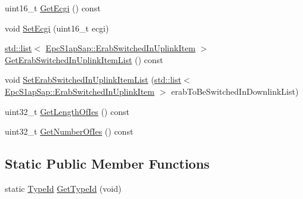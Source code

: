 \begin{DoxyCompactItemize}
\item 
uint16\+\_\+t \hyperlink{classns3_1_1EpcS1APPathSwitchRequestAcknowledgeHeader_a753c5050bbbef6228c28b811a1da42e6}{Get\+Ecgi} () const 
\item 
void \hyperlink{classns3_1_1EpcS1APPathSwitchRequestAcknowledgeHeader_a0881fd8295050ba8e03bf91b4d874938}{Set\+Ecgi} (uint16\+\_\+t ecgi)
\item 
\hyperlink{openflow-interface_8h_afd9bcfa176617760671b67580f536fa7}{std\+::list}$<$ \hyperlink{structns3_1_1EpcS1apSap_1_1ErabSwitchedInUplinkItem}{Epc\+S1ap\+Sap\+::\+Erab\+Switched\+In\+Uplink\+Item} $>$ \hyperlink{classns3_1_1EpcS1APPathSwitchRequestAcknowledgeHeader_abd27f7282a7c81f4d72fe50d1611965e}{Get\+Erab\+Switched\+In\+Uplink\+Item\+List} () const 
\item 
void \hyperlink{classns3_1_1EpcS1APPathSwitchRequestAcknowledgeHeader_a71ec3caf9b8bc4c85e5329bdb5ed7aff}{Set\+Erab\+Switched\+In\+Uplink\+Item\+List} (\hyperlink{openflow-interface_8h_afd9bcfa176617760671b67580f536fa7}{std\+::list}$<$ \hyperlink{structns3_1_1EpcS1apSap_1_1ErabSwitchedInUplinkItem}{Epc\+S1ap\+Sap\+::\+Erab\+Switched\+In\+Uplink\+Item} $>$ erab\+To\+Be\+Switched\+In\+Downlink\+List)
\item 
uint32\+\_\+t \hyperlink{classns3_1_1EpcS1APPathSwitchRequestAcknowledgeHeader_a08636f28826df18c38e1cba2f031aacb}{Get\+Length\+Of\+Ies} () const 
\item 
uint32\+\_\+t \hyperlink{classns3_1_1EpcS1APPathSwitchRequestAcknowledgeHeader_a030aa141527e7281272d5ad5d8b68862}{Get\+Number\+Of\+Ies} () const 
\end{DoxyCompactItemize}
\subsection*{Static Public Member Functions}
\begin{DoxyCompactItemize}
\item 
static \hyperlink{classns3_1_1TypeId}{Type\+Id} \hyperlink{classns3_1_1EpcS1APPathSwitchRequestAcknowledgeHeader_a3ba1b361553a704f9f2addc1ad884459}{Get\+Type\+Id} (void)
\end{DoxyCompactItemize}
